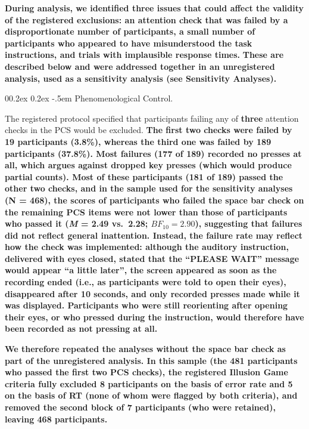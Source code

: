 \documentclass[
  man,
  floatsintext,
  longtable,
  nolmodern,
  notxfonts,
  notimes,
  colorlinks=true,linkcolor=blue,citecolor=blue,urlcolor=blue]{apa7}
\makeatletter
\renewcommand{\paragraph}{\@startsection{paragraph}{4}{\parindent}%
	{0\baselineskip \@plus 0.2ex \@minus 0.2ex}%
	{-.5em}%
	{\normalfont\normalsize\bfseries\typesectitle}}
\newcounter{none} %
\makeatother
\begin{document}
\textbf{During analysis, we identified three issues that could affect
the validity of the registered exclusions: an attention check that was
failed by a disproportionate number of participants, a small number of
participants who appeared to have misunderstood the task instructions,
and trials with implausible response times.} \textbf{These are described
below and were addressed together in an unregistered analysis, used as a
sensitivity analysis (see Sensitivity Analyses).}

\paragraph{Phenomenological Control.}\label{phenomenological-control}

The registered protocol specified that participants failing any of
\textbf{three} attention checks in the PCS would be excluded.
\textbf{The first two checks were failed by 19 participants (3.8\%),
whereas the third one was failed by 189 participants (37.8\%). Most
failures (177 of 189) recorded no presses at all, which argues against
dropped key presses (which would produce partial counts). Most of these
participants (181 of 189) passed the other two checks, and in the sample
used for the sensitivity analyses (N = 468), the scores of participants
who failed the space bar check on the remaining PCS items were not lower
than those of participants who passed it (\emph{M} = 2.49 vs.~2.28;
\(BF_{10} = 2.90\)), suggesting that failures did not reflect general
inattention. Instead, the failure rate may reflect how the check was
implemented: although the auditory instruction, delivered with eyes
closed, stated that the ``PLEASE WAIT'' message would appear ``a little
later'', the screen appeared as soon as the recording ended (i.e., as
participants were told to open their eyes), disappeared after 10
seconds, and only recorded presses made while it was displayed.
Participants who were still reorienting after opening their eyes, or who
pressed during the instruction, would therefore have been recorded as
not pressing at all.}

\textbf{We therefore repeated the analyses without the space bar check
as part of the unregistered analysis. In this sample (the 481
participants who passed the first two PCS checks), the registered
Illusion Game criteria fully excluded 8 participants on the basis of
error rate and 5 on the basis of RT (none of whom were flagged by both
criteria), and removed the second block of 7 participants (who were
retained), leaving 468 participants.}
\end{document}
